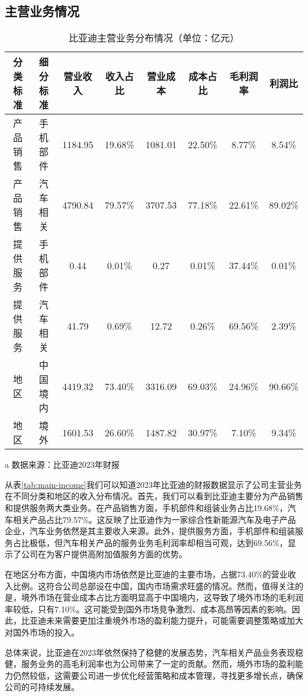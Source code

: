 \subsection{主营业务情况}
\begin{table}
  \centering
  \begin{threeparttable}[c]
    \caption{比亚迪主营业务分布情况（单位：亿元）}
    \label{tab:main-income}
    \begin{tabular}{cccccccc}
      \toprule
        分类标准 & 细分标准 & 营业收入 & 收入占比 & 营业成本 & 成本占比 & 毛利润率  & 利润比 \\ 
      \midrule
        产品销售 & 手机部件 & 1184.95  & 19.68\% & 1081.01  & 22.50\% & 8.77\% & 8.54\% \\ 
        产品销售 & 汽车相关 & 4790.84  & 79.57\% & 3707.53  & 77.18\% & 22.61\% & 89.02\% \\ 
        提供服务 & 手机部件 & 0.44  & 0.01\% & 0.27  & 0.01\% & 37.44\% & 0.01\% \\ 
        提供服务 & 汽车相关 & 41.79  & 0.69\% & 12.72  & 0.26\% & 69.56\% & 2.39\% \\ 
        地区 & 中国境内 & 4419.32  & 73.40\% & 3316.09  & 69.03\% & 24.96\% & 90.66\% \\ 
        地区 & 境外 & 1601.53  & 26.60\% & 1487.82  & 30.97\% & 7.10\% & 9.34\% \\ 
      \bottomrule
    \end{tabular}
    \begin{tablenotes}
      \item [a] 数据来源：比亚迪2023年财报
    \end{tablenotes}
  \end{threeparttable}
\end{table}

从表\eqref{tab:main-income}我们可以知道2023年比亚迪的财报数据显示了公司主营业务在不同分类和地区的收入分布情况。首先，我们可以看到比亚迪主要分为产品销售和提供服务两大类业务。在产品销售方面，手机部件和组装业务占比19.68\%，汽车相关产品占比79.57\%。这反映了比亚迪作为一家综合性新能源汽车及电子产品企业，汽车业务依然是其主要收入来源。此外，提供服务方面，手机部件和组装服务占比极低，但汽车相关产品的服务业务毛利润率却相当可观，达到69.56\%，显示了公司在为客户提供高附加值服务方面的优势。

在地区分布方面，中国境内市场依然是比亚迪的主要市场，占据73.40\%的营业收入比例。这符合公司总部设在中国，国内市场需求旺盛的情况。然而，值得关注的是，境外市场在营业成本占比方面明显高于中国境内，这导致了境外市场的毛利润率较低，只有7.10\%。这可能受到国外市场竞争激烈、成本高昂等因素的影响。因此，比亚迪未来需要更加注重境外市场的盈利能力提升，可能需要调整策略或加大对国外市场的投入。

总体来说，比亚迪在2023年依然保持了稳健的发展态势，汽车相关产品业务表现稳健，服务业务的高毛利润率也为公司带来了一定的贡献。然而，境外市场的盈利能力仍然较低，这需要公司进一步优化经营策略和成本管理，寻找更多增长点，确保公司的可持续发展。